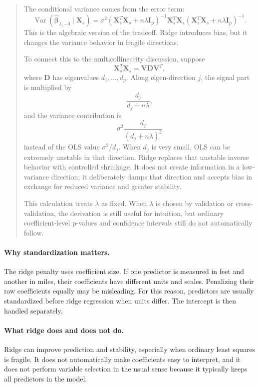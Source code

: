 \begin{quote}
The conditional variance comes from the error term:
\[
  \operatorname{Var}(\widehat{\boldsymbol{\beta}}_{\lambda,-0}\mid\mathbf{X}_s)
  =\sigma^2
  (\mathbf{X}_s^T\mathbf{X}_s+n\lambda\mathbf{I}_p)^{-1}
  \mathbf{X}_s^T\mathbf{X}_s
  (\mathbf{X}_s^T\mathbf{X}_s+n\lambda\mathbf{I}_p)^{-1}.
\]
This is the algebraic version of the tradeoff.  Ridge introduces bias, but it changes the variance behavior in fragile directions.

To connect this to the multicollinearity discussion, suppose
\[
  \mathbf{X}_s^T\mathbf{X}_s=\mathbf{V}\mathbf{D}\mathbf{V}^T,
\]
where \(\mathbf{D}\) has eigenvalues \(d_1,\ldots,d_p\).  Along eigen-direction \(j\), the signal part is multiplied by
\[
  \frac{d_j}{d_j+n\lambda},
\]
and the variance contribution is
\[
  \sigma^2\frac{d_j}{(d_j+n\lambda)^2}
\]
instead of the OLS value \(\sigma^2/d_j\).  When \(d_j\) is very small, OLS can be extremely unstable in that direction.  Ridge replaces that unstable inverse behavior with controlled shrinkage.  It does not create information in a low-variance direction; it deliberately damps that direction and accepts bias in exchange for reduced variance and greater stability.

This calculation treats \(\lambda\) as fixed.  When \(\lambda\) is chosen by validation or cross-validation, the derivation is still useful for intuition, but ordinary coefficient-level p-values and confidence intervals still do not automatically follow.
\end{quote}

\paragraph{Why standardization matters.}
The ridge penalty uses coefficient size.  If one predictor is measured in feet and another in miles, their coefficients have different units and scales.  Penalizing their raw coefficients equally may be misleading.  For this reason, predictors are usually standardized before ridge regression when units differ.  The intercept is then handled separately.

\paragraph{What ridge does and does not do.}
Ridge can improve prediction and stability, especially when ordinary least squares is fragile.  It does not automatically make coefficients easy to interpret, and it does not perform variable selection in the usual sense because it typically keeps all predictors in the model.

